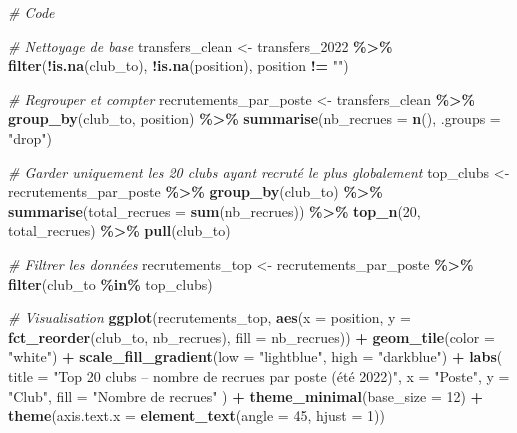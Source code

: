 \documentclass[
]{article}
\newenvironment{Shaded}{\begin{snugshade}}{\end{snugshade}}
\newcommand{\AttributeTok}[1]{\textcolor[rgb]{0.13,0.29,0.53}{#1}}
\newcommand{\CommentTok}[1]{\textcolor[rgb]{0.56,0.35,0.01}{\textit{#1}}}
\newcommand{\DecValTok}[1]{\textcolor[rgb]{0.00,0.00,0.81}{#1}}
\newcommand{\FunctionTok}[1]{\textcolor[rgb]{0.13,0.29,0.53}{\textbf{#1}}}
\newcommand{\NormalTok}[1]{#1}
\newcommand{\OtherTok}[1]{\textcolor[rgb]{0.56,0.35,0.01}{#1}}
\newcommand{\SpecialCharTok}[1]{\textcolor[rgb]{0.81,0.36,0.00}{\textbf{#1}}}
\newcommand{\StringTok}[1]{\textcolor[rgb]{0.31,0.60,0.02}{#1}}
\begin{document}
\begin{Shaded}
\begin{Highlighting}[]
\CommentTok{\# Code}

\CommentTok{\# Nettoyage de base}
\NormalTok{transfers\_clean }\OtherTok{\textless{}{-}}\NormalTok{ transfers\_2022 }\SpecialCharTok{\%\textgreater{}\%}
  \FunctionTok{filter}\NormalTok{(}\SpecialCharTok{!}\FunctionTok{is.na}\NormalTok{(club\_to), }\SpecialCharTok{!}\FunctionTok{is.na}\NormalTok{(position), position }\SpecialCharTok{!=} \StringTok{""}\NormalTok{)}

\CommentTok{\# Regrouper et compter}
\NormalTok{recrutements\_par\_poste }\OtherTok{\textless{}{-}}\NormalTok{ transfers\_clean }\SpecialCharTok{\%\textgreater{}\%}
  \FunctionTok{group\_by}\NormalTok{(club\_to, position) }\SpecialCharTok{\%\textgreater{}\%}
  \FunctionTok{summarise}\NormalTok{(}\AttributeTok{nb\_recrues =} \FunctionTok{n}\NormalTok{(), }\AttributeTok{.groups =} \StringTok{"drop"}\NormalTok{)}

\CommentTok{\# Garder uniquement les 20 clubs ayant recruté le plus globalement}
\NormalTok{top\_clubs }\OtherTok{\textless{}{-}}\NormalTok{ recrutements\_par\_poste }\SpecialCharTok{\%\textgreater{}\%}
  \FunctionTok{group\_by}\NormalTok{(club\_to) }\SpecialCharTok{\%\textgreater{}\%}
  \FunctionTok{summarise}\NormalTok{(}\AttributeTok{total\_recrues =} \FunctionTok{sum}\NormalTok{(nb\_recrues)) }\SpecialCharTok{\%\textgreater{}\%}
  \FunctionTok{top\_n}\NormalTok{(}\DecValTok{20}\NormalTok{, total\_recrues) }\SpecialCharTok{\%\textgreater{}\%}
  \FunctionTok{pull}\NormalTok{(club\_to)}

\CommentTok{\# Filtrer les données}
\NormalTok{recrutements\_top }\OtherTok{\textless{}{-}}\NormalTok{ recrutements\_par\_poste }\SpecialCharTok{\%\textgreater{}\%}
  \FunctionTok{filter}\NormalTok{(club\_to }\SpecialCharTok{\%in\%}\NormalTok{ top\_clubs)}

\CommentTok{\# Visualisation }
\FunctionTok{ggplot}\NormalTok{(recrutements\_top, }\FunctionTok{aes}\NormalTok{(}\AttributeTok{x =}\NormalTok{ position, }\AttributeTok{y =} \FunctionTok{fct\_reorder}\NormalTok{(club\_to, nb\_recrues), }\AttributeTok{fill =}\NormalTok{ nb\_recrues)) }\SpecialCharTok{+}
  \FunctionTok{geom\_tile}\NormalTok{(}\AttributeTok{color =} \StringTok{"white"}\NormalTok{) }\SpecialCharTok{+}
  \FunctionTok{scale\_fill\_gradient}\NormalTok{(}\AttributeTok{low =} \StringTok{"lightblue"}\NormalTok{, }\AttributeTok{high =} \StringTok{"darkblue"}\NormalTok{) }\SpecialCharTok{+}
  \FunctionTok{labs}\NormalTok{(}
    \AttributeTok{title =} \StringTok{"Top 20 clubs – nombre de recrues par poste (été 2022)"}\NormalTok{,}
    \AttributeTok{x =} \StringTok{"Poste"}\NormalTok{,}
    \AttributeTok{y =} \StringTok{"Club"}\NormalTok{,}
    \AttributeTok{fill =} \StringTok{"Nombre de recrues"}
\NormalTok{  ) }\SpecialCharTok{+}
  \FunctionTok{theme\_minimal}\NormalTok{(}\AttributeTok{base\_size =} \DecValTok{12}\NormalTok{) }\SpecialCharTok{+}
  \FunctionTok{theme}\NormalTok{(}\AttributeTok{axis.text.x =} \FunctionTok{element\_text}\NormalTok{(}\AttributeTok{angle =} \DecValTok{45}\NormalTok{, }\AttributeTok{hjust =} \DecValTok{1}\NormalTok{))}
\end{Highlighting}
\end{Shaded}
\end{document}
